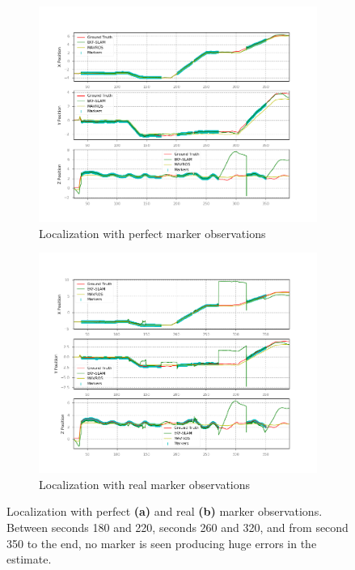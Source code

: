 \begin{figure}
    \centering
    \begin{subfigure}{\textwidth}
        \includegraphics[width=1\linewidth]{Images/fig21-fake-markers-wmap.png}
        \caption{Localization with perfect marker observations}
        \label{fig:chapter3:simulation:b:fake-markers-real-map}
    \end{subfigure}
    \begin{subfigure}{\textwidth}
        \includegraphics[width=1\linewidth]{Images/fig21-real-marker-wmap.png}
        \caption{Localization with real marker observations}
        \label{fig:chapter3:simulation:b:real-markers-real-map}
    \end{subfigure}
    \caption[Localization with perfect and real marker observations]{Localization with perfect \textbf{(a)} and real \textbf{(b)} marker observations. Between seconds 180 and 220, seconds 260 and 320, and from second 350 to the end, no marker is seen producing huge errors in the estimate.}
\end{figure}

